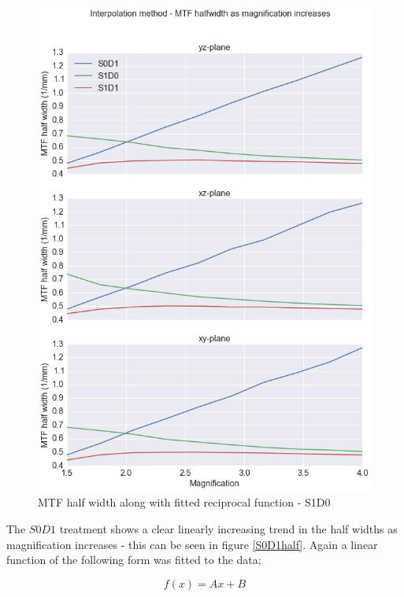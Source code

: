 \documentclass[
  twoside,
  11pt, a4paper,
  footinclude=true,
  headinclude=true,
  cleardoublepage=empty
]{scrbook}
\begin{document}
\begin{figure}[h!]
  \centering
    \includegraphics[width=\textwidth]{code/MTF_and_PSF/MTF_Interp_Polar_Plots_files/MTF_Interp_Polar_Plots_6_0.png}
    \caption{MTF half width along with fitted reciprocal function - S1D0}
        \label{S1D0half}
\end{figure}

The $S0D1$ treatment shows a clear linearly increasing trend in the half widths as magnification increases - this can be seen in figure \ref{S0D1half}. Again a linear function of the following form was fitted to the data;

\[
f(x) = Ax + B
\]
\end{document}
